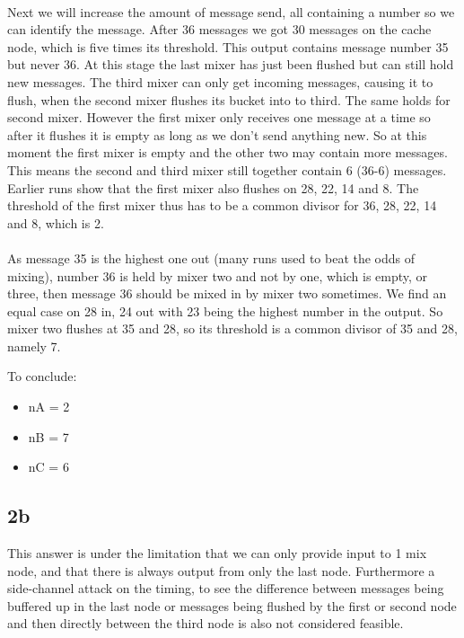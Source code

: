 \documentclass{article}
\begin{document}
\paragraph{} Next we will increase the amount of message send, all containing a number so we can identify the message.
After 36 messages we got 30 messages on the cache node, which is five times its threshold.
This output contains message number 35 but never 36.
At this stage the last mixer has just been flushed but can still hold new messages. The third mixer can only get incoming messages, causing it to flush, when the second mixer flushes its bucket into to third.
The same holds for second mixer. However the first mixer only receives one message at a time so after it flushes it is empty as long as we don't send anything new. So at this moment the first mixer is empty and the other two may contain more messages.
This means the second and third mixer still together contain 6 (36-6) messages. 
Earlier runs show that the first mixer also flushes on 28, 22, 14 and 8. The threshold of the first mixer thus has to be a common divisor for 36, 28, 22, 14 and 8, which is 2.
\paragraph{}
As message 35 is the highest one out (many runs used to beat the odds of mixing), number 36 is held by mixer two and not by one, which is empty, or three, then message 36 should be mixed in by mixer two sometimes.
We find an equal case on 28 in, 24 out with 23 being the highest number in the output. 
So mixer two flushes at 35 and 28, so its threshold is a common divisor of 35 and 28, namely 7.

To conclude:
\begin{itemize}
 \item nA = 2
 \item nB = 7
 \item nC = 6
\end{itemize}

\subsection{2b}
This answer is under the limitation that we can only provide input to 1 mix node, and that there is always output from only the last node. Furthermore a side-channel attack on the timing, to see the difference between messages being buffered up in the last node or messages being flushed by the first or second node and then directly between the third node is also not considered feasible.
\end{document}
